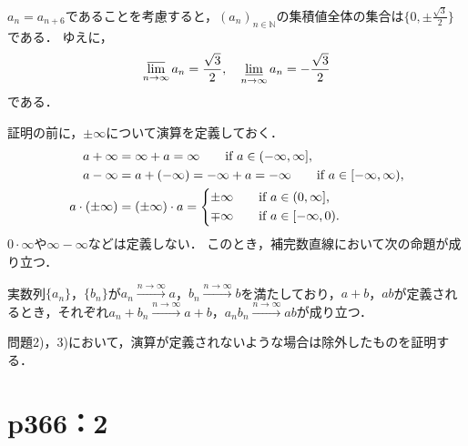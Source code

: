 \documentclass[a4paper,10pt,fleqn]{ltjsarticle}
\begin{document}
\begin{tleftbar}
    $ a_{n} = a_{n+6}$であることを考慮すると，$(a_n)_{n \in \mathbb{N}}$の集積値全体の集合は$\{ 0 , \pm \frac{\sqrt{3}}{2} \}$である．
    ゆえに，
    \[
        \varlimsup_{n \to \infty} a_n = \frac{\sqrt{3}}{2} , \quad \varliminf_{n \to \infty} a_n =-\frac{\sqrt{3}}{2}
    \]
    である．
\end{tleftbar}

\newpage 


  証明の前に，$\pm \infty$について演算を定義しておく．
  \begin{align*}
    a + \infty &= \infty + a = \infty \qquad \text{if $a \in (-\infty,\infty]$}, \\
    a - \infty &= a + (-\infty) = -\infty + a = -\infty \qquad \text{if $a \in [-\infty,\infty)$}, \\
    a \cdot (\pm \infty) &= (\pm \infty) \cdot a =
    \begin{cases*}
      \pm \infty \quad & if $a \in (0,\infty]$, \\
      \mp \infty \quad & if $a \in [-\infty,0)$.
    \end{cases*}
  \end{align*}
  $0 \cdot \infty$や$\infty - \infty$などは定義しない．
  このとき，補完数直線において次の命題が成り立つ．
  \begin{lemm*}
    実数列$\{a_n\}$，$\{b_n\}$が$a_n \xrightarrow{n \to \infty} a$，$b_n \xrightarrow{n \to \infty} b$を満たしており，$a+b$，$ab$が定義されるとき，それぞれ$a_n + b_n \xrightarrow{n \to \infty} a+b$，$a_n b_n \xrightarrow{n \to \infty} ab$が成り立つ．
  \end{lemm*}
  問題2)，3)において，演算が定義されないような場合は除外したものを証明する．
  

  \section*{p366：2}
\end{document}
